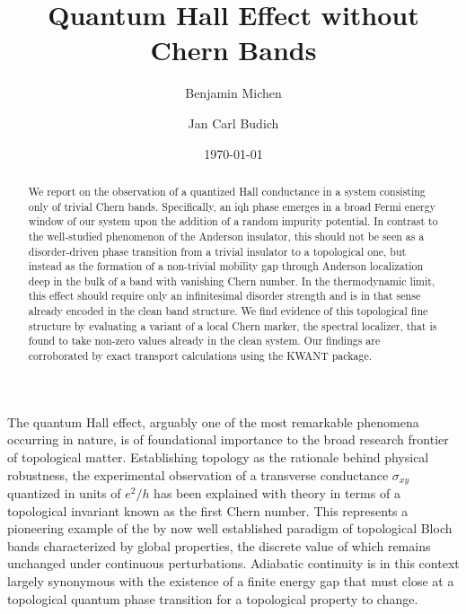\documentclass[aps,prl,amsmath,amssymb,twocolumn]{revtex4-2}
\begin{document}
\title{Quantum Hall Effect without Chern Bands}
\author{Benjamin Michen}
\author{Jan Carl Budich}
\date{\today}

\begin{abstract}
We report on the observation of a quantized Hall conductance in a system consisting only of trivial Chern bands. Specifically, an \gls{iqh} phase emerges in a broad Fermi energy window of our system upon the addition of a random impurity potential. In contrast to the well-studied phenomenon of the Anderson insulator, this should not be seen as a disorder-driven phase transition from a trivial insulator to a topological one, but instead as the formation of a non-trivial mobility gap through Anderson localization deep in the bulk of a band with vanishing Chern number. In the thermodynamic limit, this effect should require only an infinitesimal disorder strength and is in that sense already encoded in the clean band structure. We find evidence of this topological fine structure by evaluating a variant of a local Chern marker, the spectral localizer, that is found to take non-zero values already in the clean system. Our findings are corroborated by exact transport calculations using the KWANT package. 
\end{abstract}

\maketitle

The quantum Hall effect, arguably one of the most remarkable phenomena occurring in nature, is of foundational importance to the broad research frontier of topological matter. Establishing topology as the rationale behind physical robustness, the experimental observation of a transverse conductance $\sigma_{xy}$ quantized in units of $e^2/h$ has been explained with theory in terms of a topological invariant known as the first Chern number. This represents a pioneering example of the by now well established paradigm of topological Bloch bands characterized by global properties, the discrete value of which remains unchanged under continuous perturbations. Adiabatic continuity is in this context largely synonymous with the existence of a finite energy gap that must close at a topological quantum phase transition for a topological property to change.
\end{document}
